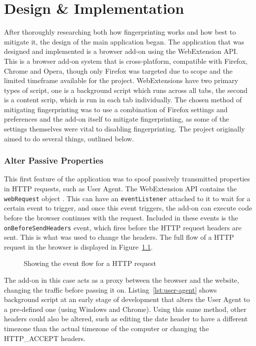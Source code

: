 \chapter{Design \& Implementation}

After thoroughly researching both how fingerprinting works and how best to mitigate it, the design of the main application began.
The application that was designed and implemented is a browser add-on using the WebExtension API\@.
This is a browser add-on system that is cross-platform, compatible with Firefox, Chrome and Opera, though only Firefox was targeted due to scope and the limited timeframe available for the project.
WebExtensions have two primary types of script, one is a background script which runs across all tabs, the second is a content scrip, which is run in each tab individually.
The chosen method of mitigating fingerprinting was to use a combination of Firefox settings and preferences and the add-on itself to mitigate fingerprinting, as some of the settings themselves were vital to disabling fingerprinting.
The project originally aimed to do several things, outlined below.

\subsection{Alter Passive Properties}

This first feature of the application was to spoof passively transmitted properties in HTTP requests, such as User Agent.
The WebExtension API contains the \texttt{webRequest} object \citep{webRequest}.
This can have an \texttt{eventListener} attached to it to wait for a certain event to trigger, and once this event triggers, the add-on can execute code before the browser continues with the request.
Included in these events is the \texttt{onBeforeSendHeaders} event, which fires before the HTTP request headers are sent.
This is what was used to change the headers.
The full flow of a HTTP request in the browser is displayed in Figure~\ref{fig:webRequest-flow}.

\begin{figure}[h]
\caption{Showing the event flow for a HTTP request}
\centering
\label{fig:webRequest-flow}
\end{figure}

The add-on in this case acts as a proxy between the browser and the website, changing the traffic before passing it on.
Listing~\ref{lst:user-agent} shows background script at an early stage of development that alters the User Agent to a pre-defined one (using Windows and Chrome).
Using this same method, other headers could also be altered, such as editing the date header to have a different timezone than the actual timezone of the computer or changing the HTTP\_ACCEPT headers.

